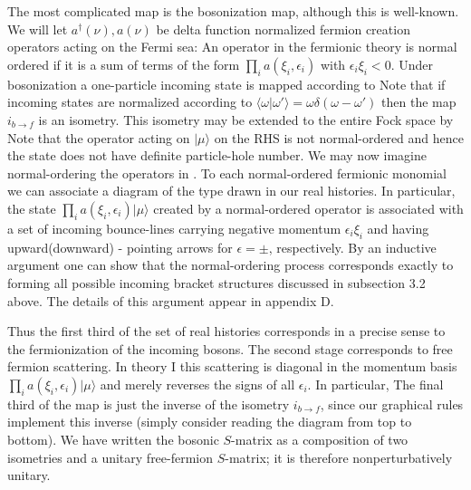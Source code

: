 The most complicated map is the bosonization map, although this
is well-known. We will let $a^\dagger(\nu),a(\nu)$ be delta function
normalized fermion creation operators acting on the Fermi sea:
\eqn{}
An operator in the fermionic theory is normal ordered if
it is a sum of terms of the form
$\prod_i a(\xi_i,\epsilon_i)$ with $\epsilon_i \xi_i<0$.
Under bosonization a one-particle incoming state is mapped according to
\eqn{}
Note that if incoming states are normalized according to
$\langle \omega|\omega'\rangle=\omega \delta(\omega-\omega')$ then
the map $i_{b\to f}$ is an isometry. This isometry may be
extended to the entire Fock space by
\eqn{}
Note that the operator acting on $|\mu \rangle$
on the RHS is not normal-ordered and hence
the state does not have definite particle-hole number.     
We may now imagine normal-ordering the
operators in \bsnztni . To each normal-ordered fermionic monomial we
can associate a diagram of the type drawn in our real histories.
In particular, the 
state $\prod_i a(\xi_i,\epsilon_i)|\mu\rangle$ created by a normal-ordered
operator 
is associated with a set of incoming bounce-lines carrying negative
momentum $\epsilon_i\xi_i$ and having upward(downward) - pointing arrows
for $\epsilon=\pm$, respectively. By an inductive argument one
can show that the normal-ordering process corresponds exactly to
forming all possible incoming bracket structures discussed in
subsection 3.2 above. The details of this argument appear in appendix D.
 
Thus the first third of the set of real histories
corresponds in a precise sense to the fermionization of the
incoming bosons. The second stage corresponds to free fermion
scattering. In theory I this scattering is diagonal in the
momentum basis $\prod_i a(\xi_i,\epsilon_i)|\mu\rangle$ and
merely reverses the signs of all $\epsilon_i$. In particular,
\eqn{}
The final third of the map is just the inverse of the isometry
$i_{b\to f}$, since our graphical rules implement this inverse
(simply consider reading the diagram from top to bottom). We
have written the bosonic $S$-matrix as a composition of two isometries
and a unitary free-fermion $S$-matrix; it is therefore nonperturbatively
unitary.
 
